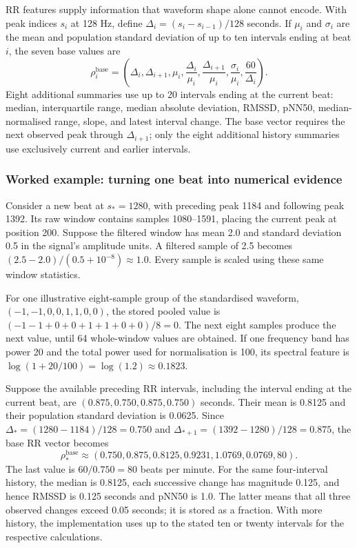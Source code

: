 RR features supply information that waveform shape alone cannot encode.
With peak indices $s_i$ at 128 Hz, define
$\Delta_i=(s_i-s_{i-1})/128$ seconds. If $\mu_i$ and $\sigma_i$ are the
mean and population standard deviation of up to ten intervals ending at
beat $i$, the seven base values are
\begin{equation}
 \rho_i^{\mathrm{base}}=
 \left(\Delta_i,\Delta_{i+1},\mu_i,
 \frac{\Delta_i}{\mu_i},\frac{\Delta_{i+1}}{\mu_i},
 \frac{\sigma_i}{\mu_i},\frac{60}{\Delta_i}\right).
 \label{eq:method-base-rr-calculation}
\end{equation}
Eight additional summaries use up to 20 intervals ending at the current beat:
median, interquartile range, median absolute deviation, RMSSD, pNN50,
median-normalised range, slope, and latest interval change. The base vector
requires the next observed peak through $\Delta_{i+1}$; only the eight
additional history summaries use exclusively current and earlier intervals.

\subsubsection*{Worked example: turning one beat into numerical evidence}

Consider a new beat at $s_*=1280$, with preceding peak 1184 and following
peak 1392. Its raw window contains samples 1080--1591, placing the current
peak at position 200. Suppose the filtered window has mean 2.0 and standard
deviation 0.5 in the signal's amplitude units. A filtered sample of 2.5
becomes $(2.5-2.0)/(0.5+10^{-8})\approx1.0$. Every sample is scaled using
these same window statistics.

For one illustrative eight-sample group of the standardised waveform,
$(-1,-1,0,0,1,1,0,0)$, the stored pooled value is
$(-1-1+0+0+1+1+0+0)/8=0$. The next eight samples produce the next value,
until 64 whole-window values are obtained. If one frequency band has power
20 and the total power used for normalisation is 100, its spectral feature
is $\log(1+20/100)=\log(1.2)\approx0.1823$.

Suppose the available preceding RR intervals, including the interval ending
at the current beat, are $(0.875,0.750,0.875,0.750)$ seconds. Their mean is
0.8125 and their population standard deviation is 0.0625. Since
$\Delta_*=(1280-1184)/128=0.750$ and
$\Delta_{*+1}=(1392-1280)/128=0.875$, the base RR vector becomes
\begin{equation}
 \rho_*^{\mathrm{base}}\approx
 (0.750,0.875,0.8125,0.9231,1.0769,0.0769,80).
 \label{eq:method-example-rr}
\end{equation}
The last value is $60/0.750=80$ beats per minute. For the same four-interval
history, the median is 0.8125, each successive change has magnitude 0.125,
and hence RMSSD is 0.125 seconds and pNN50 is 1.0. The latter means that
all three observed changes exceed 0.05 seconds; it is stored as a fraction.
With more history, the implementation uses up to the stated ten or twenty
intervals for the respective calculations.

